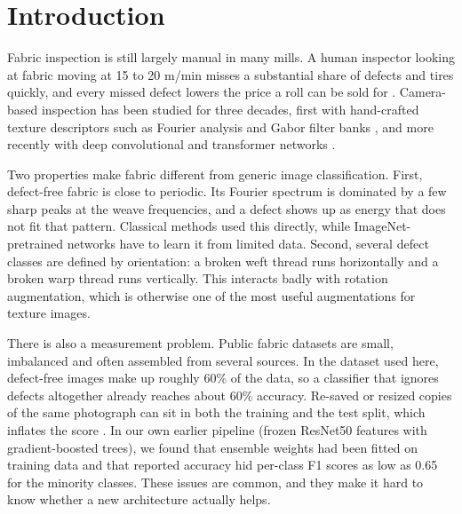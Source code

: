 \documentclass[preprint,12pt,authoryear]{elsarticle}
\begin{document}
\section{Introduction}
\label{sec:intro}

Fabric inspection is still largely manual in many mills. A human inspector looking at fabric
moving at 15 to 20 m/min misses a substantial share of defects and tires quickly, and every
missed defect lowers the price a roll can be sold for \citep{kumar2008survey,ngan2011review}.
Camera-based inspection has been studied for three decades, first with hand-crafted texture
descriptors such as Fourier analysis \citep{chan2000fourier,tsai1999directional} and Gabor filter
banks \citep{kumar2002gabor}, and more recently with deep convolutional and transformer networks
\citep{kahraman2023review,carrilho2024survey,li2021survey}.

Two properties make fabric different from generic image classification. First, defect-free fabric
is close to periodic. Its Fourier spectrum is dominated by a few sharp peaks at the weave
frequencies, and a defect shows up as energy that does not fit that pattern. Classical methods
used this directly, while ImageNet-pretrained networks have to learn it from limited data. Second,
several defect classes are defined by orientation: a broken weft thread runs horizontally and a
broken warp thread runs vertically. This interacts badly with rotation augmentation, which is
otherwise one of the most useful augmentations for texture images.

There is also a measurement problem. Public fabric datasets are small, imbalanced and often
assembled from several sources. In the dataset used here, defect-free images make up roughly
60\% of the data, so a classifier that ignores defects altogether already reaches about 60\%
accuracy. Re-saved or resized copies of the same photograph can sit in both the training and the
test split, which inflates the score \citep{kaufman2012leakage}. In our own earlier pipeline
(frozen ResNet50 features with gradient-boosted trees), we found that ensemble weights had been fitted
on training data and that reported accuracy hid per-class F1 scores as low as 0.65 for the
minority classes. These issues are common, and they make it hard to know whether a new
architecture actually helps.
\end{document}
